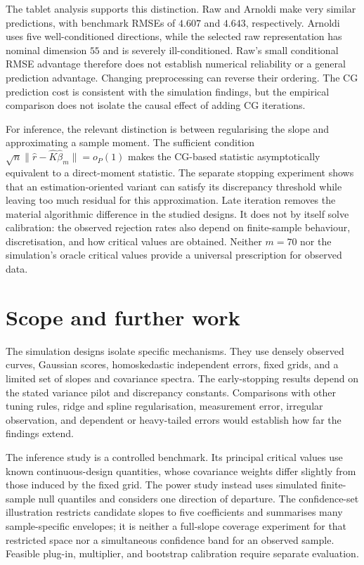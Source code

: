 The tablet analysis supports this distinction. Raw and Arnoldi make very
similar predictions, with benchmark RMSEs of $4.607$ and $4.643$,
respectively. Arnoldi uses five well-conditioned directions, while the
selected raw representation has nominal dimension $55$ and is severely
ill-conditioned. Raw's small conditional RMSE advantage therefore does
not establish numerical reliability or a general prediction advantage.
Changing preprocessing can reverse their ordering. The CG prediction cost
is consistent with the simulation findings, but the empirical comparison
does not isolate the causal effect of adding CG iterations.

For inference, the relevant distinction is between regularising the slope
and approximating a sample moment. The sufficient condition
$\sqrt n\|\widehat r-\widehat K\widehat\beta_m\|=o_P(1)$ makes the
CG-based statistic asymptotically equivalent to a direct-moment statistic.
The separate stopping experiment shows that an estimation-oriented variant
can satisfy its discrepancy threshold while leaving too much residual for
this approximation. Late iteration removes the material algorithmic
difference in the studied designs. It does not by itself solve calibration:
the observed rejection rates also depend on finite-sample behaviour,
discretisation, and how critical values are obtained. Neither $m=70$ nor
the simulation's oracle critical values provide a universal prescription
for observed data.

\section{Scope and further work}

The simulation designs isolate specific mechanisms. They use densely
observed curves, Gaussian scores, homoskedastic independent errors, fixed
grids, and a limited set of slopes and covariance spectra. The early-stopping
results depend on the stated variance pilot and discrepancy constants.
Comparisons with other tuning rules, ridge and spline regularisation,
measurement error, irregular observation, and dependent or heavy-tailed
errors would establish how far the findings extend.

The inference study is a controlled benchmark. Its principal critical
values use known continuous-design quantities, whose covariance weights
differ slightly from those induced by the fixed grid. The power study
instead uses simulated finite-sample null quantiles and considers one
direction of departure. The confidence-set illustration restricts candidate
slopes to five coefficients and summarises many sample-specific envelopes;
it is neither a full-slope coverage experiment for that restricted space
nor a simultaneous confidence band for an observed sample. Feasible
plug-in, multiplier, and bootstrap calibration require separate evaluation.

